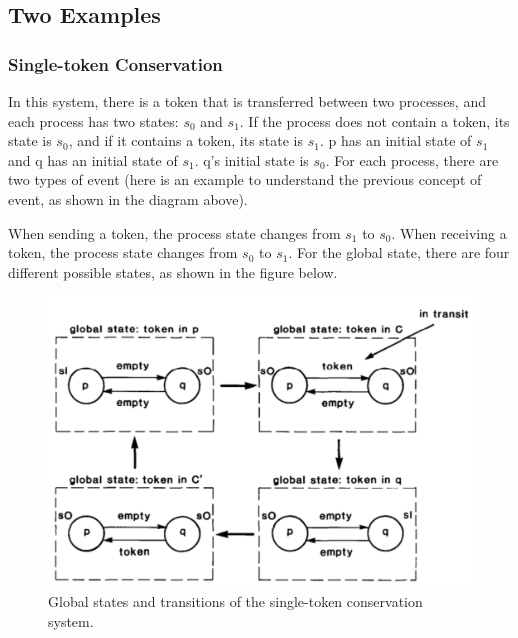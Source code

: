 \documentclass[acmlarge]{acmart}
\begin{document}
\subsection{Two Examples}
\subsubsection{Single-token Conservation}
In this system, there is a token that is transferred between two processes, and each process has two states: $s_0$ and $s_1$. If the process does not contain a token, its state is $s_0$, and if it contains a token, its state is $s_1$. p has an initial state of $s_1$ and q has an initial state of $s_1$. q's initial state is $s_0$. For each process, there are two types of event (here is an example to understand the previous concept of event, as shown in the diagram above).

When sending a token, the process state changes from $s_1$ to $s_0$.
When receiving a token, the process state changes from $s_0$ to $s_1$.
For the global state, there are four different possible states, as shown in the figure below.

\begin{figure}[h]
  \centering
  \includegraphics[width=\linewidth]{./single-token.png}
  \caption{Global states and transitions of the single-token conservation system.}
\end{figure}
\end{document}
